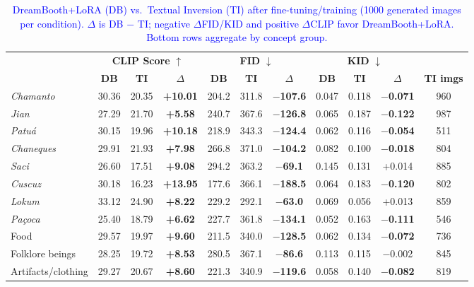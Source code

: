 \documentclass[pdflatex,sn-mathphys-num]{sn-jnl}%
\theoremstyle{thmstyleone}%
\theoremstyle{thmstyletwo}%
\theoremstyle{thmstylethree}%
\begin{document}
\begin{table}[htbp]
    \centering
    \caption{\textcolor{blue}{DreamBooth+LoRA (DB) vs.\ Textual Inversion (TI) after fine-tuning/training (1000 generated images per condition). $\Delta$ is DB $-$ TI; negative $\Delta$FID/KID and positive $\Delta$CLIP favor DreamBooth+LoRA. Bottom rows aggregate by concept group.}}
    \label{tab:ti-comparison}
    \fontsize{7}{8.5}\selectfont
    \setlength{\tabcolsep}{2pt}
    \begin{tabular}{@{}lcccccccccc@{}}
        \toprule
        & \multicolumn{3}{c}{\textbf{CLIP Score} $\uparrow$} & \multicolumn{3}{c}{\textbf{FID} $\downarrow$} & \multicolumn{3}{c}{\textbf{KID} $\downarrow$} & \\
        \cmidrule(lr){2-4} \cmidrule(lr){5-7} \cmidrule(lr){8-10}
        & \textbf{DB} & \textbf{TI} & \textbf{$\Delta$} & \textbf{DB} & \textbf{TI} & \textbf{$\Delta$} & \textbf{DB} & \textbf{TI} & \textbf{$\Delta$} & \textbf{TI imgs} \\
        \midrule
        \textit{Chamanto}   & 30.36 & 20.35 & \textbf{+10.01} & 204.2 & 311.8 & \textbf{$-$107.6} & 0.047 & 0.118 & \textbf{$-$0.071} & 960 \\
        \textit{Jian}       & 27.29 & 21.70 & \textbf{+5.58}  & 240.7 & 367.6 & \textbf{$-$126.8} & 0.065 & 0.187 & \textbf{$-$0.122} & 987 \\
        \textit{Patu\'a}    & 30.15 & 19.96 & \textbf{+10.18} & 218.9 & 343.3 & \textbf{$-$124.4} & 0.062 & 0.116 & \textbf{$-$0.054} & 511 \\
        \textit{Chaneques}  & 29.91 & 21.93 & \textbf{+7.98}  & 266.8 & 371.0 & \textbf{$-$104.2} & 0.082 & 0.100 & \textbf{$-$0.018} & 804 \\
        \textit{Saci}       & 26.60 & 17.51 & \textbf{+9.08}  & 294.2 & 363.2 & \textbf{$-$69.1}  & 0.145 & 0.131 & +0.014 & 885 \\
        \textit{Cuscuz}     & 30.18 & 16.23 & \textbf{+13.95} & 177.6 & 366.1 & \textbf{$-$188.5} & 0.064 & 0.183 & \textbf{$-$0.120} & 802 \\
        \textit{Lokum}      & 33.12 & 24.90 & \textbf{+8.22}  & 229.2 & 292.1 & \textbf{$-$63.0}  & 0.069 & 0.056 & +0.013 & 859 \\
        \textit{Pa\c{c}oca} & 25.40 & 18.79 & \textbf{+6.62}  & 227.7 & 361.8 & \textbf{$-$134.1} & 0.052 & 0.163 & \textbf{$-$0.111} & 546 \\
        \midrule
        Food                & 29.57 & 19.97 & \textbf{+9.60}  & 211.5 & 340.0 & \textbf{$-$128.5} & 0.062 & 0.134 & \textbf{$-$0.072} & 736 \\
        Folklore beings     & 28.25 & 19.72 & \textbf{+8.53}  & 280.5 & 367.1 & \textbf{$-$86.6}  & 0.113 & 0.115 & $-$0.002 & 845 \\
        Artifacts/clothing  & 29.27 & 20.67 & \textbf{+8.60}  & 221.3 & 340.9 & \textbf{$-$119.6} & 0.058 & 0.140 & \textbf{$-$0.082} & 819 \\
        \bottomrule
    \end{tabular}
\end{table}
\end{document}
